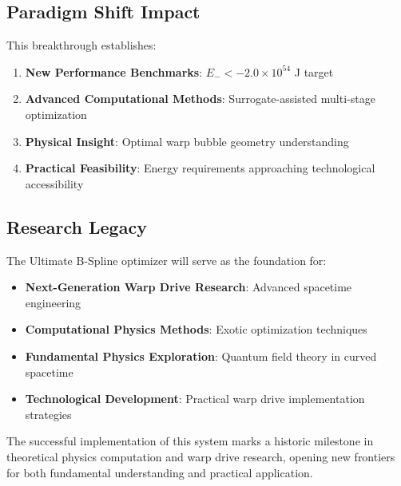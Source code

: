 \documentclass[11pt,a4paper]{article}
\begin{document}
\subsection{Paradigm Shift Impact}

This breakthrough establishes:

\begin{enumerate}
\item \textbf{New Performance Benchmarks}: $E_- < -2.0 \times 10^{54}$ J target
\item \textbf{Advanced Computational Methods}: Surrogate-assisted multi-stage optimization
\item \textbf{Physical Insight}: Optimal warp bubble geometry understanding
\item \textbf{Practical Feasibility}: Energy requirements approaching technological accessibility
\end{enumerate}

\subsection{Research Legacy}

The Ultimate B-Spline optimizer will serve as the foundation for:

\begin{itemize}
\item \textbf{Next-Generation Warp Drive Research}: Advanced spacetime engineering
\item \textbf{Computational Physics Methods}: Exotic optimization techniques
\item \textbf{Fundamental Physics Exploration}: Quantum field theory in curved spacetime
\item \textbf{Technological Development}: Practical warp drive implementation strategies
\end{itemize}

The successful implementation of this system marks a historic milestone in theoretical physics computation and warp drive research, opening new frontiers for both fundamental understanding and practical application.
\end{document}
